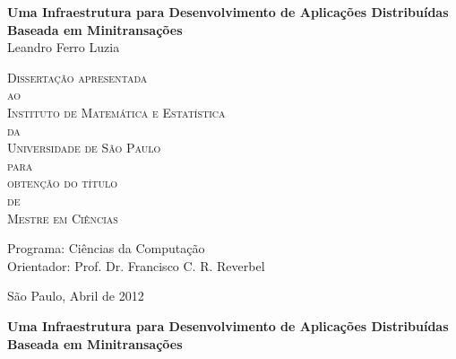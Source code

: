 \documentclass[11pt,twoside,a4paper]{book}
\begin{document}
\frontmatter 
\fancyhead[RO]{{\footnotesize\rightmark}\hspace{2em}\thepage}
\setcounter{tocdepth}{2}
\fancyhead[LE]{\thepage\hspace{2em}\footnotesize{\leftmark}}
\fancyhead[RE,LO]{}
\fancyhead[RO]{{\footnotesize\rightmark}\hspace{2em}\thepage}

\onehalfspacing

\thispagestyle{empty}
\begin{center}
    \vspace*{2.3cm}
    \textbf{\Large{Uma Infraestrutura para Desenvolvimento de Aplicações Distribuídas Baseada em Minitransações}}\\
    
    \vspace*{1.2cm}
    \Large{Leandro Ferro Luzia}
    
    \vskip 2cm
    \textsc{
    Dissertação apresentada\\[-0.25cm] 
    ao\\[-0.25cm]
    Instituto de Matemática e Estatística\\[-0.25cm]
    da\\[-0.25cm]
    Universidade de São Paulo\\[-0.25cm]
    para\\[-0.25cm]
    obtenção do título\\[-0.25cm]
    de\\[-0.25cm]
    Mestre em Ciências}
    
    \vskip 1.5cm
    Programa: Ciências da Computação\\
    Orientador: Prof. Dr. Francisco C. R. Reverbel
    \vskip 1cm
    
    \vskip 0.5cm
    \normalsize{São Paulo, Abril de 2012}
\end{center}

\newpage
\thispagestyle{empty}
    \begin{center}
        \vspace*{2.3 cm}
        \textbf{\Large{Uma Infraestrutura para Desenvolvimento de Aplicações Distribuídas Baseada em Minitransações}}\\
        \vspace*{2 cm}
    \end{center}
\end{document}
